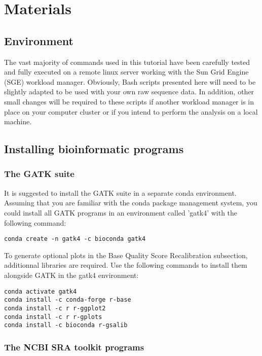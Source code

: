 \section{Materials}

\subsection{Environment}


The vast majority of commands used in this tutorial have been carefully tested and fully executed on a remote linux server working with the Sun Grid Engine (SGE) workload manager. Obviously, Bash scripts presented here will need to be slightly adapted to be used with your own raw sequence data. In addition, other small changes will be required  to these scripts if another workload manager is in place on your computer cluster or if you intend to perform the analysis on a local machine.

\subsection{Installing bioinformatic programs}

\subsubsection{The GATK suite}

It is suggested to install the GATK suite in a separate conda environment. Assuming that you are familiar with the conda package management system, you could install all GATK programs in an environment called 'gatk4' with the following command:

\begin{verbatim}
conda create -n gatk4 -c bioconda gatk4 
\end{verbatim}

To generate optional plots in the Base Quality Score Recalibration subsection, additionnal libraries are required. Use the following commands to install them alongside GATK in the gatk4 environment:

\begin{verbatim}
conda activate gatk4
conda install -c conda-forge r-base
conda install -c r r-ggplot2
conda install -c r r-gplots
conda install -c bioconda r-gsalib
\end{verbatim}


\subsubsection{The NCBI SRA toolkit programs}

